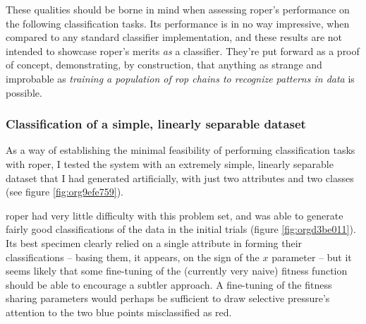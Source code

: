 \documentclass[12pt,glossary]{dalthesis}
\begin{document}
These qualities should be borne in mind when assessing \gls{roper}'s performance
on the following classification tasks. Its performance is in no way impressive,
when compared to any standard classifier implementation, and these results are
not intended to showcase \gls{roper}'s merits \emph{as} a classifier. They're put
forward as a proof of concept, demonstrating, by construction, that anything as
strange and improbable as \emph{training a population of \gls{rop} chains to recognize
patterns in data} is possible.

\subsubsection{Classification of a simple, linearly separable dataset}
\label{sec:org8bfcc20}
\label{orgfa08f3a}

As a way of establishing the minimal feasibility of performing classification
tasks with \gls{roper}, I tested the system with an extremely simple, linearly
separable dataset that I had generated artificially, with just two attributes
and two classes (see figure \ref{fig:org9efe759}).

\gls{roper} had very little difficulty with this problem set, and was able to
generate fairly good classifications of the data in the initial trials (figure 
\ref{fig:orgd3be011}). Its best specimen clearly relied on a single
attribute in forming their classifications -- basing them, it appears, on the
sign of the \(x\) parameter -- but it seems likely that some fine-tuning of the
(currently very naive) fitness function should be able to encourage a subtler
approach. A fine-tuning of the fitness sharing parameters would perhaps be
sufficient to draw selective pressure's attention to the two blue points
misclassified as red.
\end{document}
